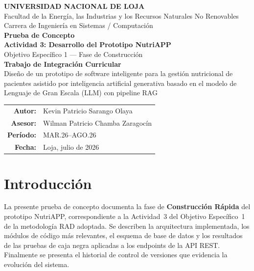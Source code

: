 \documentclass[12pt,a4paper]{article}
\begin{document}
\begin{titlepage}
  \centering
  {\Large\bfseries UNIVERSIDAD NACIONAL DE LOJA}\\[0.3cm]
  {\large Facultad de la Energía, las Industrias y los Recursos Naturales No Renovables}\\[0.1cm]
  {\large Carrera de Ingeniería en Sistemas / Computación}\\[2.5cm]

  {\LARGE\bfseries Prueba de Concepto}\\[0.4cm]
  {\Large\bfseries Actividad 3: Desarrollo del Prototipo NutriAPP}\\[0.4cm]
  {\large Objetivo Específico 1 — Fase de Construcción}\\[2cm]

  {\large\bfseries Trabajo de Integración Curricular}\\[0.3cm]
  {\normalsize Diseño de un prototipo de software inteligente para la gestión nutricional
  de pacientes asistido por inteligencia artificial generativa basado en
  el modelo de Lenguaje de Gran Escala (LLM) con pipeline RAG}\\[2cm]

  \begin{tabular}{rl}
    \textbf{Autor:}  & Kevin Patricio Sarango Olaya \\[0.2cm]
    \textbf{Asesor:} & Wilman Patricio Chamba Zaragocín \\[0.2cm]
    \textbf{Período:} & MAR.26--AGO.26 \\[0.2cm]
    \textbf{Fecha:}   & Loja, julio de 2026 \\
  \end{tabular}
\end{titlepage}

\tableofcontents
\clearpage

\section{Introducción}

La presente prueba de concepto documenta la fase de \textbf{Construcción Rápida} del prototipo
NutriAPP, correspondiente a la Actividad~3 del Objetivo Específico~1 de la metodología RAD
adoptada. Se describen la arquitectura implementada, los módulos de código más relevantes,
el esquema de base de datos y los resultados de las pruebas de caja negra aplicadas a los
endpoints de la API REST. Finalmente se presenta el historial de control de versiones que
evidencia la evolución del sistema.
\end{document}
